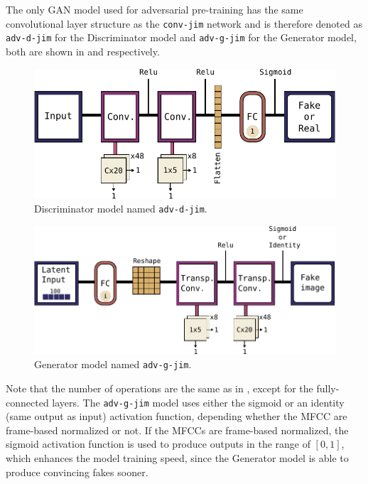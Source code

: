 The only GAN model used for adversarial pre-training has the same convolutional layer structure as the \texttt{conv-jim} network and is therefore denoted as \texttt{adv-d-jim} for the Discriminator model and \texttt{adv-g-jim} for the Generator model, both are shown in  and  respectively.
\begin{figure}[!ht]
  \centering
    \includegraphics[height=0.2\textwidth]{./4_nn/figs/nn_arch_adv_d_jim.pdf}
  \caption{Discriminator model named \texttt{adv-d-jim}.}
  \label{fig:nn_arch_adv_d_jim}
\end{figure}
\FloatBarrier
\noindent
\begin{figure}[!ht]
  \centering
    \includegraphics[height=0.23\textwidth]{./4_nn/figs/nn_arch_adv_g_jim.pdf}
  \caption{Generator model named \texttt{adv-g-jim}.}
  \label{fig:nn_arch_adv_g_jim}
\end{figure}
\FloatBarrier
\noindent
Note that the number of operations are the same as in , except for the fully-connected layers.
The \texttt{adv-g-jim} model uses either the sigmoid or an identity (same output as input) activation function, depending whether the MFCC are frame-based normalized or not.
If the MFCCs are frame-based normalized, the sigmoid activation function is used to produce outputs in the range of $[0, 1]$, which enhances the model training speed, since the Generator model is able to produce convincing fakes sooner.



